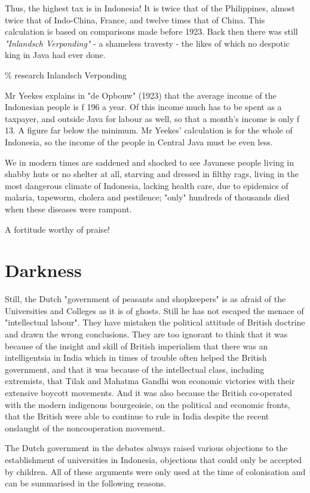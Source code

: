 Thus, the highest tax is in Indonesia! It is twice that of the Philippines, 
almost twice that of Indo-China, France, and twelve times that of China. 
This calculation is based on comparisons made before 1923. Back then there was still 
\emph{"Inlandsch Verponding"} - a shameless travesty - the likes of which no despotic king in Java had ever done.\vskip 0.2in

\% research Inlandsch Verponding

Mr Yeekes explains in "de Opbouw" (1923) that the average income 
of the Indonesian people is f 196 a year. Of this income much has 
to be spent as a taxpayer, and outside Java for labour as well, 
so that a month's income is only f 13. A figure far below the minimum. 
Mr Yeekes' calculation is for the whole of Indonesia, so the income of 
the people in Central Java must be even less.\vskip 0.2in

We in modern times are saddened and shocked to see Javanese people 
living in shabby huts or no shelter at all, starving and dressed in 
filthy rags, living in the most dangerous climate of Indonesia, lacking 
health care, due to epidemics of malaria, tapeworm, cholera and pestilence; 
"only" hundreds of thousands died when these diseases were rampant.\vskip 0.2in

A fortitude worthy of praise!

\section{Darkness}

Still, the Dutch "government of peasants and shopkeepers" is as afraid of the 
Universities and Colleges as it is of ghosts. Still he has not escaped the menace 
of "intellectual labour". They have mistaken the political attitude of British doctrine 
and drawn the wrong conclusions. They are too ignorant to think that it was 
because of the insight and skill of British imperialism that there was an 
intelligentsia in India which in times of trouble often helped the British 
government, and that it was because of the intellectual class, including extremists, 
that Tilak and Mahatma Gandhi won economic victories with their extensive boycott movements. 
And it was also because the British co-operated with the modern indigenous bourgeoisie, on 
the political and economic fronts, that the British were able to continue to rule in India 
despite the recent onslaught of the noncooperation movement.\vskip 0.2in

The Dutch government in the debates always raised various objections to the establishment 
of universities in Indonesia, objections that could only be accepted by children. All of 
these arguments were only used at the time of colonisation and can be summarised in the following reasons.\vskip 0.2in

